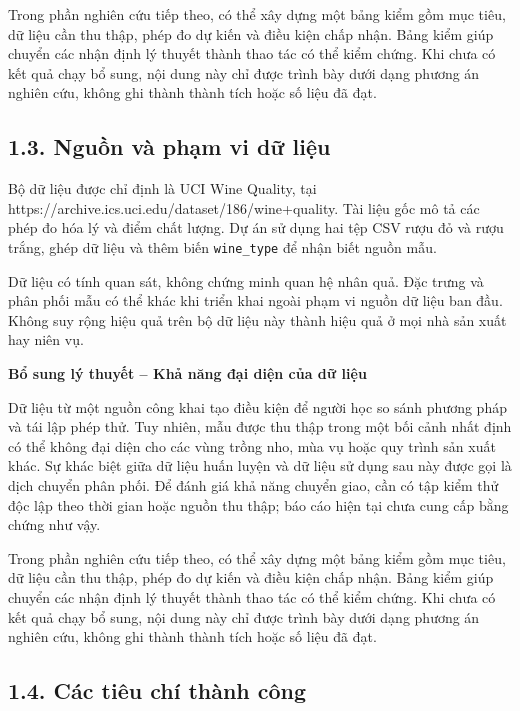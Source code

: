 \documentclass[12pt,a4paper,oneside]{article}
\begin{document}
Trong phần nghiên cứu tiếp theo, có thể xây dựng một bảng kiểm gồm mục tiêu, dữ liệu cần thu thập, phép đo dự kiến và điều kiện chấp nhận. Bảng kiểm giúp chuyển các nhận định lý thuyết thành thao tác có thể kiểm chứng. Khi chưa có kết quả chạy bổ sung, nội dung này chỉ được trình bày dưới dạng phương án nghiên cứu, không ghi thành thành tích hoặc số liệu đã đạt.\par

\subsection*{1.3. Nguồn và phạm vi dữ liệu}

Bộ dữ liệu được chỉ định là UCI Wine Quality, tại
https://archive.ics.uci.edu/dataset/186/wine+quality. Tài liệu gốc mô tả
các phép đo hóa lý và điểm chất lượng. Dự án sử dụng hai tệp CSV rượu đỏ
và rượu trắng, ghép dữ liệu và thêm biến \texttt{wine\_type} để nhận
biết nguồn mẫu.

Dữ liệu có tính quan sát, không chứng minh quan hệ nhân quả. Đặc trưng
và phân phối mẫu có thể khác khi triển khai ngoài phạm vi nguồn dữ liệu
ban đầu. Không suy rộng hiệu quả trên bộ dữ liệu này thành hiệu quả ở
mọi nhà sản xuất hay niên vụ.


\par\noindent\textbf{Bổ sung lý thuyết -- Khả năng đại diện của dữ liệu}\par
Dữ liệu từ một nguồn công khai tạo điều kiện để người học so sánh phương pháp và tái lập phép thử. Tuy nhiên, mẫu được thu thập trong một bối cảnh nhất định có thể không đại diện cho các vùng trồng nho, mùa vụ hoặc quy trình sản xuất khác. Sự khác biệt giữa dữ liệu huấn luyện và dữ liệu sử dụng sau này được gọi là dịch chuyển phân phối. Để đánh giá khả năng chuyển giao, cần có tập kiểm thử độc lập theo thời gian hoặc nguồn thu thập; báo cáo hiện tại chưa cung cấp bằng chứng như vậy.\par

Trong phần nghiên cứu tiếp theo, có thể xây dựng một bảng kiểm gồm mục tiêu, dữ liệu cần thu thập, phép đo dự kiến và điều kiện chấp nhận. Bảng kiểm giúp chuyển các nhận định lý thuyết thành thao tác có thể kiểm chứng. Khi chưa có kết quả chạy bổ sung, nội dung này chỉ được trình bày dưới dạng phương án nghiên cứu, không ghi thành thành tích hoặc số liệu đã đạt.\par

\subsection*{1.4. Các tiêu chí thành công}
\end{document}

